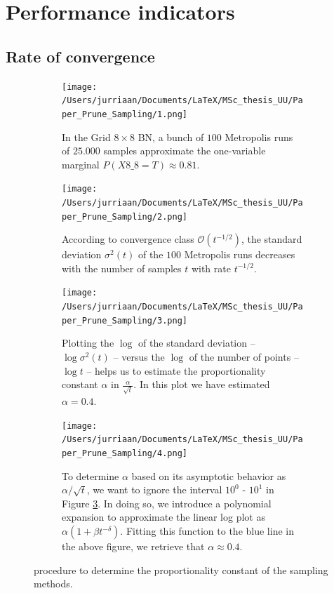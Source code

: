 \documentclass[a4paper, twoside, 11pt]{report}
\theoremstyle{plain}
\theoremstyle{definition}
\theoremstyle{remark}
\begin{document}
\section{Performance indicators}
\subsection{Rate of convergence}

\begin{figure}[H]
\centering
\begin{subfigure}[t]{0.5\textwidth}
  \centering
  \captionsetup{width = 0.9\textwidth}
  \texttt{[image: /Users/jurriaan/Documents/LaTeX/MSc\_thesis\_UU/Paper\_Prune\_Sampling/1.png]}
  \caption{In the Grid $8 \times 8$ BN, a bunch of $100$ Metropolis runs of $25.000$ samples approximate the one-variable marginal $P(X 8\_8 = T) \approx 0.81$.}
  \label{sub_a}
\end{subfigure}%
\begin{subfigure}[t]{0.5\textwidth}
  \centering
  \captionsetup{width = 0.9\textwidth}
  \texttt{[image: /Users/jurriaan/Documents/LaTeX/MSc\_thesis\_UU/Paper\_Prune\_Sampling/2.png]}
  \caption{According to convergence class $\mathcal{O}(t^{-1/2})$, the standard deviation ${\sigma}^2(t)$ of the $100$ Metropolis runs decreases with the number of samples $t$ with rate $t^{-1/2}$.}
  \label{sub_b}
\end{subfigure}

\begin{subfigure}[t]{0.5\textwidth}
  \centering
  \captionsetup{width = 0.9\textwidth}
  \texttt{[image: /Users/jurriaan/Documents/LaTeX/MSc\_thesis\_UU/Paper\_Prune\_Sampling/3.png]}
  \caption{Plotting the $\log$ of the standard deviation -- $\log {\sigma}^2(t)$ -- versus the $\log$ of the number of points -- $\log t$ -- helps us to estimate the proportionality constant $\alpha$ in $\frac{\alpha}{\sqrt{t}}$. In this plot we have estimated $\alpha = 0.4$.}
  \label{sub_c}
\end{subfigure}%
\begin{subfigure}[t]{0.5\textwidth}
  \centering
  \captionsetup{width = 0.9\textwidth}
  \texttt{[image: /Users/jurriaan/Documents/LaTeX/MSc\_thesis\_UU/Paper\_Prune\_Sampling/4.png]}
  \caption{To determine $\alpha$ based on its asymptotic behavior as $\alpha / \sqrt{t}$, we want to ignore the interval $10^0$ - $10^1$ in Figure \ref{sub_c}. In doing so, we introduce a polynomial expansion to approximate the linear log plot as $\alpha(1+\beta t^{-\delta})$. Fitting this function to the blue line in the above figure, we retrieve that $\alpha \approx 0.4$. }
  \label{sub_d}
\end{subfigure}
\caption{procedure to determine the proportionality constant of the sampling methods.}
\label{determine-c}
\end{figure}
\end{document}
